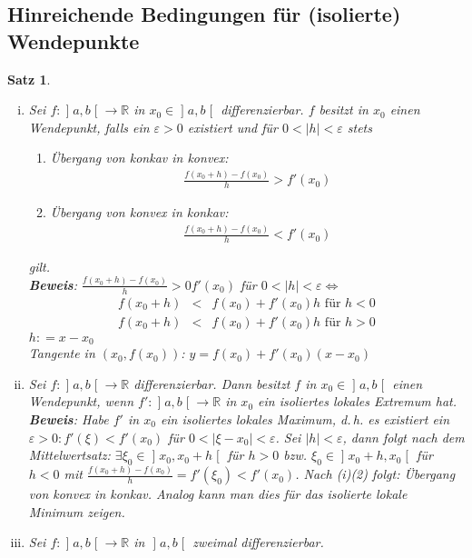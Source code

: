 \documentclass[ngerman,titlepage,twoside, parskip=half*]{scrreprt}
\newcommand*{\R}{\mathbb{R}}
\theoremstyle{plain}
\newtheorem{theorem}{Satz}[section]
\theoremstyle{definition}
\theoremstyle{remark}
\newcommand*{\abs}[2][]{#1\lvert#2#1\rvert}
\newcommand*{\coloneqq}{\mathrel{\mathop:}=}
\newcommand*{\bsofint}[1]{\mathopen{]}#1\mathclose{[}} %
\begin{document}
\subsection{Hinreichende Bedingungen für (isolierte) Wendepunkte}
\begin{theorem}
  \begin{enumerate}[(i)]
    \item Sei $f\colon\bsofint{a,b}\rightarrow\R$ in $x_0\in\bsofint{a,b}$ differenzierbar.
      $f$ besitzt in $x_0$ einen Wendepunkt, falls ein $\varepsilon>0$
      existiert und für $0<\abs{h}<\varepsilon$ stets
      \begin{enumerate}[(1)]
	\item Übergang von konkav in konvex:
	  \begin{gather*}\frac{f(x_0+h)-f(x_0)}{h}>f'(x_0)\end{gather*}
	\item Übergang von konvex in konkav:
	  \begin{gather*}\frac{f(x_0+h)-f(x_0)}{h}<f'(x_0)\end{gather*}
      \end{enumerate}
      gilt.\\
      \textbf{Beweis}: $\frac{f(x_0+h)-f(x_0)}{h}>0f'(x_0)$ für $0<\abs{h}
      <\varepsilon\Leftrightarrow$
      \begin{align*}
	f(x_0+h) & < & f(x_0)+f'(x_0)h \text{ für } h<0\\
	f(x_0+h) & < & f(x_0)+f'(x_0)h \text{ für } h>0
      \end{align*}
      $h\coloneqq x-x_0$\\
      Tangente in $(x_0,f(x_0))$: $y=f(x_0)+f'(x_0)(x-x_0)$
    \item Sei $f\colon\bsofint{a,b}\rightarrow\R$ differenzierbar. Dann besitzt $f$
      in $x_0\in\bsofint{a,b}$ einen Wendepunkt, wenn $f'\colon\bsofint{a,b}\rightarrow\R$
      in $x_0$ ein isoliertes lokales Extremum hat.\\
      \textbf{Beweis}: Habe $f'$ in $x_0$ ein isoliertes lokales Maximum,
      d.\,h. es existiert ein $\varepsilon>0\colon f'(\xi)<f'(x_0)$ für $0<
      \abs{\xi-x_0}<\varepsilon$. Sei $\abs{h}<\varepsilon$, dann folgt nach dem
      Mittelwertsatz: $\exists\xi_0\in \bsofint{x_0,x_0+h}$ für $h>0$ bzw.
      $\xi_0\in \bsofint{x_0+h,x_0}$ für $h<0$ mit $\frac{f(x_0+h)-f(x_0)}{h}
      =f'(\xi_0)<f'(x_0)$. Nach (i)(2) folgt: Übergang von konvex in
      konkav. Analog kann man dies für das isolierte lokale Minimum
      zeigen.
    \item Sei $f\colon\bsofint{a,b}\rightarrow\R$ in $\bsofint{a,b}$ zweimal differenzierbar.

\end{enumerate}
\end{theorem}
\end{document}
